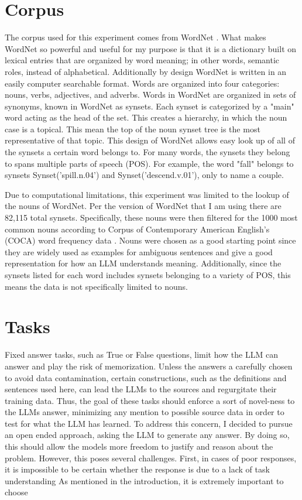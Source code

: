 \documentclass{brandeis-thesis3.2}
\theoremstyle{plain}
\theoremstyle{definition}
\theoremstyle{remark}
\numberwithin{equation}{section}
\renewcommand\cite{\citep}
\begin{document}
\section{Corpus}
The corpus used for this experiment comes from WordNet \cite{miller_introduction_nodate}. What makes WordNet so powerful and useful for my purpose is that it is a dictionary built on lexical entries that are organized by word meaning; in other words, semantic roles, instead of alphabetical. Additionally by design WordNet is written in an easily computer searchable format. Words are organized into four categories: nouns, verbs, adjectives, and adverbs. Words in WordNet are organized in sets of synonyms, known in WordNet as synsets. Each synset is categorized by a "main" word acting as the head of the set. This creates a hierarchy, in which the noun case is a topical. This mean the top of the noun synset tree is the most representative of that topic. This design of WordNet allows easy look up of all of the synsets a certain word belongs to. For many words, the synsets they belong to spans multiple parts of speech (POS). For example, the word "fall" belongs to synsets Synset('spill.n.04') and  Synset('descend.v.01'), only to name a couple.

Due to computational limitations, this experiment was limited to the lookup of the nouns of WordNet. Per the version of WordNet that I am using there are 82,115 total synsets. Specifically, these nouns were then filtered for the 1000 most common nouns according to Corpus of Contemporary American English's (COCA) word frequency data \cite{}. Nouns were chosen as a good starting point since they are widely used as examples for ambiguous sentences and give a good representation for how an LLM understands meaning. Additionally, since the synsets listed for each word includes synsets belonging to a variety of POS, this means the data is not specifically limited to nouns.

\section{Tasks}
Fixed answer tasks, such as True or False questions, limit how the LLM can answer and play the risk of memorization. Unless the answers a carefully chosen to avoid data contamination, certain constructions, such as the definitions and sentences used here, can lead the LLMs to the sources and regurgitate their training data. Thus, the goal of these tasks should enforce a sort of novel-ness to the LLMs answer, minimizing any mention to possible source data in order to test for what the LLM has learned. To address this concern, I decided to pursue an open ended approach, asking the LLM to generate any answer. By doing so, this should allow the models more freedom to justify and reason about the problem. However, this poses several challenges. First, in cases of poor responses, it is impossible to be certain whether the response is due to a lack of task understanding 
As mentioned in the introduction, it is extremely important to choose
\end{document}
